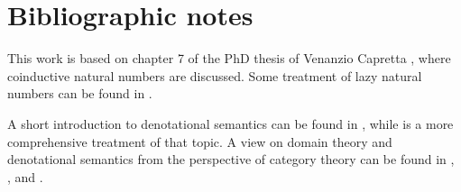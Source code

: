 \documentclass[a4paper]{article}
\begin{document}

\section{Bibliographic notes}

This work is based on chapter 7 of the PhD thesis of Venanzio Capretta
\cite{Capretta2002}, where coinductive natural numbers are discussed.  Some
treatment of lazy natural numbers can be found in \cite{Escardo1993}.

A short introduction to denotational semantics can be found in
\cite{Allison1986}, while \cite{Gunter1992} is a more comprehensive treatment of
that topic.  A view on domain theory and denotational semantics from the
perspective of category theory can be found in \cite{Pierce1991},
\cite{Bird1997}, \cite{Mitchell1996} and \cite{BarrWells1990}.




\end{document}
